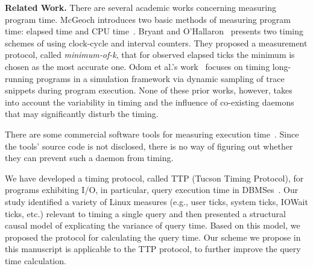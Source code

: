 \documentclass[letter]{ieice}
\begin{document}
{\bf Related Work.} 
There are several academic works concerning measuring program time. 
McGeoch introduces
two basic methods of measuring program time: elapsed time and CPU time~\cite{Mcgeoch12}. 
Bryant and O'Hallaron~\cite{Randal03} 
presents two timing schemes of using clock-cycle and interval counters. 
They proposed a measurement protocol, called {\em minimum-of-k}, 
that for observed elapsed ticks the minimum is chosen as the most accurate one. 
Odom et al.'s work~\cite{Odom05} focuses on timing long-running programs 
in a simulation framework via 
dynamic sampling of trace snippets during program execution. 
None of these prior works, however, takes into account the variability in 
timing and the influence of co-existing daemons that may significantly disturb the timing.


There are some commercial software tools for measuring execution time~\cite{VTune,TimeSys,WindView}. 
Since the tools' source code is not disclosed, there is no way of figuring out 
whether they can prevent such a daemon from timing. 

We have developed a timing protocol, called TTP (Tucson Timing Protocol), 
for programs exhibiting I/O, in particular, query execution time in \hbox{DBMSes}~\cite{Currim}.
Our study identified a variety of Linux measures 
(e.g., user ticks, system ticks, IOWait ticks, etc.) 
relevant to timing a single query and then 
presented a structural causal model 
of explicating the variance of query time. 
Based on this model, we proposed the protocol for calculating the query time. 
Our scheme we propose in this manuscript 
is applicable to the TTP protocol, to further improve the query time calculation.
\end{document}
